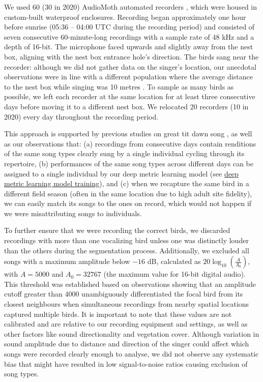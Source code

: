 \documentclass[9pt, onecolumn, twoside, lineno]{gsajnl}
\begin{document}
We used 60 (30 in 2020) AudioMoth automated recorders \autocite{hill2019}, which were housed in custom-built waterproof enclosures. Recording began approximately one hour before sunrise (05:36 -- 04:00 UTC during the recording period) and consisted of seven consecutive 60-minute-long recordings with a sample rate of 48 kHz and a depth of 16-bit. The microphone faced upwards and slightly away from the nest box, aligning with the nest box entrance hole's direction. The birds sang near the recorder: although we did not gather data on the singer's location, our anecdotal observations were in line with a different population where the average distance to the nest box while singing was 10 metres \autocite{halfwerk2012}. To sample as many birds as possible, we left each recorder at the same location for at least three consecutive days before moving it to a different nest box. We relocated 20 recorders (10 in 2020) every day throughout the recording period.

This approach is supported by previous studies on great tit dawn song \autocite{keen2020, naguib2019,snijders2015, boucaud2016, boucaud2016a}, as well as our observations that: (a) recordings from consecutive days contain renditions of the same song types clearly sung by a single individual cycling through its repertoire, (b) performances of the same song types across different days can be assigned to a single individual by our deep metric learning model (see \hyperref[sc:song-similarity]{deep metric learning model training}), and (c) when we recapture the same bird in a different field season (often in the same location due to high adult site fidelity), we can easily match its songs to the ones on record, which would not happen if we were misattributing songs to individuals.

To further ensure that we were recording the correct birds, we discarded recordings with more than one vocalizing bird unless one was distinctly louder than the others during the segmentation process. Additionally, we excluded all songs with a maximum amplitude below $-16$ dB, calculated as $20\log_{10}\left(\frac{A}{A_0}\right)$, with $A=5000$ and $A_0=32767$ (the maximum value for 16-bit digital audio). This threshold was established based on observations showing that an amplitude cutoff greater than 4000 unambiguously differentiated the focal bird from its closest neighbours when simultaneous recordings from nearby spatial locations captured multiple birds. It is important to note that these values are not calibrated and are relative to our recording equipment and settings, as well as other factors like sound directionality and vegetation cover. Although variation in sound amplitude due to distance and direction of the singer could affect which songs were recorded clearly enough to analyse, we did not observe any systematic bias that might have resulted in low signal-to-noise ratios causing exclusion of song types.
\end{document}
